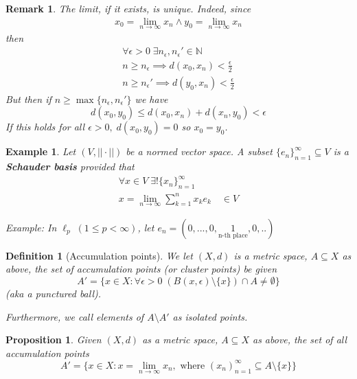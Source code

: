 \documentclass[11pt, oneside]{book}
\theoremstyle{break}
\newtheorem{propo}{Proposition}[section]
\newtheorem*{remark}{Remark}
\newtheorem{defn}{Definition}[section]
\newtheorem{eg}{Example}[section]
\newcommand{\bb}[1]{\mathbb{#1}}			%
\begin{document}
\begin{remark}
	The limit, if it exists, is unique. Indeed, since
	\begin{gather*}
		x_0 = \lim_{n \to \infty} x_n \land y_0 = \lim_{n \to \infty} x_n
	\end{gather*}
	then
	\begin{gather*}
		\forall \epsilon > 0 \; \exists n_\epsilon, n_\epsilon' \in \bb{N} \\
		n \geq n_\epsilon \implies d(x_0, x_n) < \frac{\epsilon}{2} \\
		n \geq n_\epsilon' \implies d(y_0, x_n) < \frac{\epsilon}{2} 
	\end{gather*}
	But then if $n \geq \max\{n_\epsilon, n_\epsilon'\}$ we have
	\begin{equation*}
		d(x_0, y_0) \leq d(x_0, x_n) + d(x_n, y_0) < \epsilon
	\end{equation*}
	If this holds for all $\epsilon > 0, \; d(x_0, y_0) = 0$ so $x_0 = y_0$.
\end{remark}

\begin{eg}
	Let $(V, ||\cdot||)$ be a normed vector space. A subset $\{e_n\}_{n = 1}^\infty \subseteq V$ is a \textbf{Schauder basis} provided that
	\begin{gather*}
		\forall x \in V \; \exists! \{x_n\}_{n = 1}^\infty \\
		x = \lim_{n \to \infty} \sum_{k=1}^{n} x_k e_k \quad \in V
	\end{gather*}

	Example: In $\ell_p \; (1 \leq p < \infty)$, let $e_n = (0, ..., 0, \underset{\text{n-th place}}{1}, 0, ..)$
\end{eg}

\begin{defn}[Accumulation points]
	We let $(X, d)$ is a metric space, $A \subseteq X$ as above, the set of accumulation points (or cluster points) be given
	\begin{equation}
		A' = \{x \in X : \forall \epsilon > 0 \; \left( B(x, \epsilon) \setminus \{x\} \right) \cap A \neq \emptyset \}
	\end{equation}
	(aka a punctured ball).

	Furthermore, we call elements of $A \setminus A'$ as isolated points.
\end{defn}

\begin{propo}
	Given $(X, d)$ as a metric space, $A \subseteq X$ as above, the set of all accumulation points
	\begin{equation*}
		A' = \{x \in X : x = \lim_{n \to \infty} x_n, \text{ where } (x_n)_{n = 1}^\infty \subseteq A \setminus \{x\} \}
	\end{equation*}
\end{propo}
\end{document}
